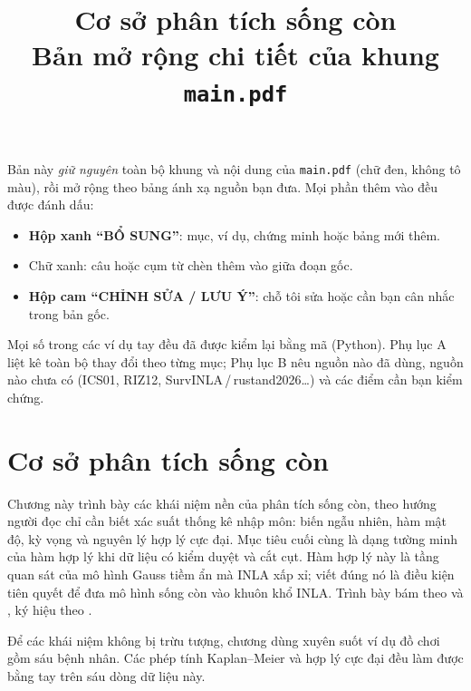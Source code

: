 \documentclass[11pt,a4paper,notitlepage]{report}
\title{\bfseries Cơ sở phân tích sống còn\\[4pt]\large Bản mở rộng chi tiết của khung \mdseries\texttt{main.pdf}}
\author{}
\date{}
\newcommand{\bs}[1]{\textcolor{bsblue}{#1}}
\begin{document}
\maketitle

\begin{bosung}
Bản này \emph{giữ nguyên} toàn bộ khung và nội dung của \texttt{main.pdf} (chữ đen, không tô màu), rồi mở rộng theo bảng
ánh xạ nguồn bạn đưa. Mọi phần thêm vào đều được đánh dấu:
\begin{itemize}[leftmargin=1.4em,itemsep=1pt,topsep=2pt]
  \item \textbf{Hộp xanh ``BỔ SUNG''}: mục, ví dụ, chứng minh hoặc bảng mới thêm.
  \item \bs{Chữ xanh}: câu hoặc cụm từ chèn thêm vào giữa đoạn gốc.
  \item \textbf{Hộp cam ``CHỈNH SỬA / LƯU Ý''}: chỗ tôi sửa hoặc cần bạn cân nhắc trong bản gốc.
\end{itemize}
Mọi số trong các ví dụ tay đều đã được kiểm lại bằng mã (Python). Phụ lục A liệt kê toàn bộ thay đổi theo từng mục;
Phụ lục B nêu nguồn nào đã dùng, nguồn nào chưa có (ICS01, RIZ12, SurvINLA\,/\,rustand2026\ldots) và các điểm cần bạn kiểm chứng.
\end{bosung}

\tableofcontents

\chapter{Cơ sở phân tích sống còn}

Chương này trình bày các khái niệm nền của phân tích sống còn, theo hướng người đọc chỉ cần
biết xác suất thống kê nhập môn: biến ngẫu nhiên, hàm mật độ, kỳ vọng và nguyên lý hợp lý cực
đại. Mục tiêu cuối cùng là dạng tường minh của hàm hợp lý khi dữ liệu có kiểm duyệt và cắt cụt.
Hàm hợp lý này là tầng quan sát của mô hình Gauss tiềm ẩn mà INLA xấp xỉ; viết đúng nó là
điều kiện tiên quyết để đưa mô hình sống còn vào khuôn khổ INLA. Trình bày bám theo \cite{klein2003} và \cite{ibrahim2001}, ký hiệu theo \cite{rustand2026}.

Để các khái niệm không bị trừu tượng, chương dùng xuyên suốt ví dụ đồ chơi gồm sáu bệnh nhân.
Các phép tính Kaplan--Meier và hợp lý cực đại đều làm được bằng tay trên sáu dòng dữ liệu này.
\end{document}
